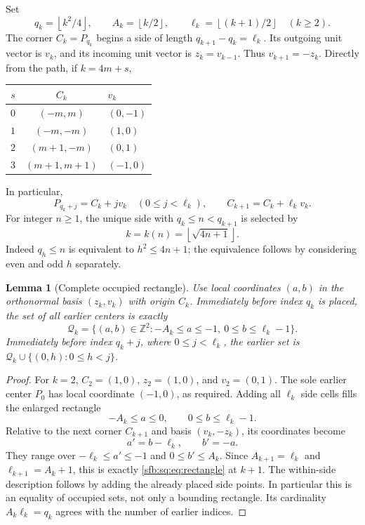 \documentclass[11pt]{article}
\newtheorem{lemma}[theorem]{Lemma}
\theoremstyle{remark}\newtheorem{remark}[theorem]{Remark}
\newcommand{\Z}{\mathbb Z}
\newcommand{\floor}[1]{\left\lfloor #1\right\rfloor}
\begin{document}
Set
\begin{equation}\label{sfb:sq:eq:quarter}
 q_k=\floor{k^2/4},\qquad A_k=\floor{k/2},\qquad
 \ell_k=\floor{(k+1)/2}\quad(k\ge2).
\end{equation}
The corner $C_k=P_{q_k}$ begins a side of length
$q_{k+1}-q_k=\ell_k$. Its outgoing unit vector is $v_k$, and its incoming unit vector is $z_k=v_{k-1}$. Thus $v_{k+1}=-z_k$. Directly from the path, if $k=4m+s$,
\begin{center}
\begin{tabular}{ccl}
\toprule
$s$ & $C_k$ & $v_k$\\
\midrule
$0$ & $(-m,m)$ & $(0,-1)$\\
$1$ & $(-m,-m)$ & $(1,0)$\\
$2$ & $(m+1,-m)$ & $(0,1)$\\
$3$ & $(m+1,m+1)$ & $(-1,0)$\\
\bottomrule
\end{tabular}
\end{center}
In particular,
\begin{equation}\label{sfb:sq:eq:sidecoords}
 P_{q_k+j}=C_k+jv_k\quad(0\le j<\ell_k),\qquad
 C_{k+1}=C_k+\ell_kv_k.
\end{equation}
For integer $n\ge1$, the unique side with $q_k\le n<q_{k+1}$ is selected by
\begin{equation}\label{sfb:sq:eq:k}
 k=k(n)=\floor{\sqrt{4n+1}}.
\end{equation}
Indeed $q_h\le n$ is equivalent to $h^2\le4n+1$; the equivalence follows by considering even and odd $h$ separately.

\begin{lemma}[Complete occupied rectangle]\label{sfb:sq:lem:rectangle}
Use local coordinates $(a,b)$ in the orthonormal basis $(z_k,v_k)$ with origin $C_k$. Immediately before index $q_k$ is placed, the set of all earlier centers is exactly
\begin{equation}\label{sfb:sq:eq:rectangle}
 \mathcal Q_k=\{(a,b)\in\Z^2:-A_k\le a\le-1,\ 0\le b\le\ell_k-1\}.
\end{equation}
Immediately before index $q_k+j$, where $0\le j<\ell_k$, the earlier set is
$\mathcal Q_k\cup\{(0,h):0\le h<j\}$.
\end{lemma}
\begin{proof}
For $k=2$, $C_2=(1,0)$, $z_2=(1,0)$, and $v_2=(0,1)$. The sole earlier center $P_0$ has local coordinate $(-1,0)$, as required. Adding all $\ell_k$ side cells fills the enlarged rectangle
\[
 -A_k\le a\le0,\qquad 0\le b\le\ell_k-1.
\]
Relative to the next corner $C_{k+1}$ and basis $(v_k,-z_k)$, its coordinates become
\[
 a'=b-\ell_k,\qquad b'=-a.
\]
They range over $-\ell_k\le a'\le-1$ and $0\le b'\le A_k$. Since $A_{k+1}=\ell_k$ and $\ell_{k+1}=A_k+1$, this is exactly \eqref{sfb:sq:eq:rectangle} at $k+1$. The within-side description follows by adding the already placed side points. In particular this is an equality of occupied sets, not only a bounding rectangle. Its cardinality $A_k\ell_k=q_k$ agrees with the number of earlier indices.
\end{proof}
\end{document}
